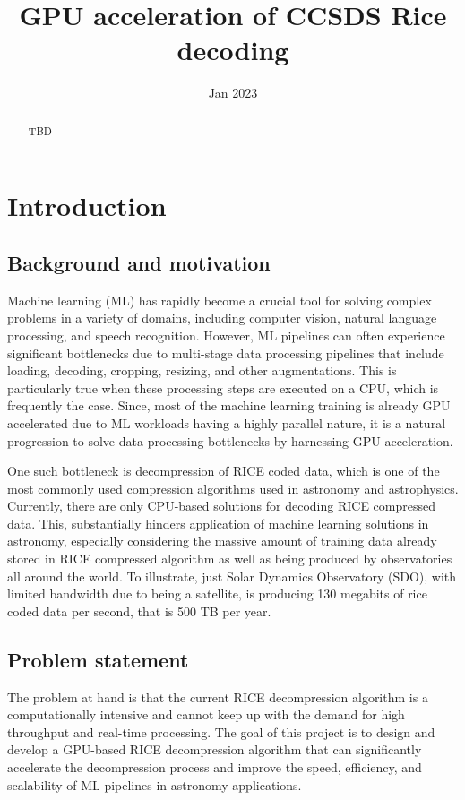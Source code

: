 \documentclass[licencjacka,en]{pracamgr}
\title{GPU acceleration of CCSDS Rice decoding}
\date{Jan 2023}
\begin{document}
\maketitle

\begin{abstract}
	TBD
\end{abstract}

\tableofcontents

\chapter{Introduction}
\section{Background and motivation}
Machine learning (ML) has rapidly become a crucial tool for solving complex problems in a variety of domains, including computer vision, natural language processing, and speech recognition. However, ML pipelines can often experience significant bottlenecks due to multi-stage data processing pipelines that include loading, decoding, cropping, resizing, and other augmentations. This is particularly true when these processing steps are executed on a CPU, which is frequently the case. Since, most of the machine learning training is already GPU accelerated due to ML workloads having a highly parallel nature, it is a natural progression to solve data processing bottlenecks by harnessing GPU acceleration.

One such bottleneck is decompression of RICE coded data, which is one of the most commonly used compression algorithms used in astronomy and astrophysics. Currently, there are only CPU-based solutions for decoding RICE compressed data. This, substantially hinders application of machine learning solutions in astronomy, especially considering the massive amount of training data already stored in RICE compressed algorithm as well as being produced by observatories all around the world. To illustrate, just Solar Dynamics Observatory (SDO), with limited bandwidth due to being a satellite, is producing 130 megabits of rice coded data per second, that is 500 TB per year.

\section{Problem statement}
The problem at hand is that the current RICE decompression algorithm is a computationally intensive and cannot keep up with the demand for high throughput and real-time processing. The goal of this project is to design and develop a GPU-based RICE decompression algorithm that can significantly accelerate the decompression process and improve the speed, efficiency, and scalability of ML pipelines in astronomy applications.
\end{document}
